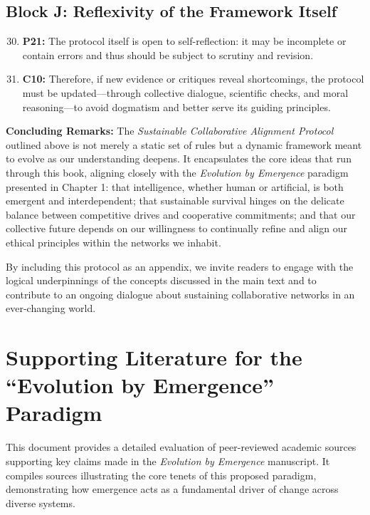 \documentclass[12pt,openany]{book}
\let\cleardoublepage\clearpage %
\begin{document}
\section*{Block J: Reflexivity of the Framework Itself}
\begin{enumerate}
    \setcounter{enumi}{29}
    \item \textbf{P21:} The protocol itself is open to self-reflection: it may be incomplete or contain errors and thus should be subject to scrutiny and revision.
    \item \textbf{C10:} Therefore, if new evidence or critiques reveal shortcomings, the protocol must be updated—through collective dialogue, scientific checks, and moral reasoning—to avoid dogmatism and better serve its guiding principles.
\end{enumerate}

\bigskip
\textbf{Concluding Remarks:}   
The \emph{Sustainable Collaborative Alignment Protocol} outlined above is not merely a static set of rules but a dynamic framework meant to evolve as our understanding deepens. It encapsulates the core ideas that run through this book, aligning closely with the \emph{Evolution by Emergence} paradigm presented in Chapter 1: that intelligence, whether human or artificial, is both emergent and interdependent; that sustainable survival hinges on the delicate balance between competitive drives and cooperative commitments; and that our collective future depends on our willingness to continually refine and align our ethical principles within the networks we inhabit. %

By including this protocol as an appendix, we invite readers to engage with the logical underpinnings of the concepts discussed in the main text and to contribute to an ongoing dialogue about sustaining collaborative networks in an ever-changing world.
\cleardoublepage


\chapter{Supporting Literature for the ``Evolution by Emergence'' Paradigm}

This document provides a detailed evaluation of peer-reviewed academic sources supporting key claims made in the \emph{Evolution by Emergence} manuscript. It compiles sources illustrating the core tenets of this proposed paradigm, demonstrating how emergence acts as a fundamental driver of change across diverse systems.
\end{document}

